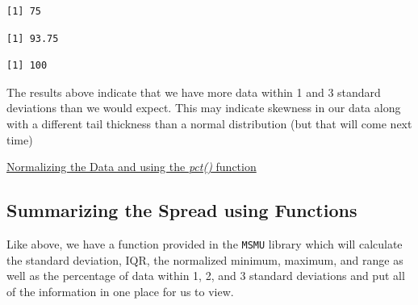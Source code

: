 \documentclass[
  letterpaper,
  DIV=11,
  numbers=noendperiod]{scrreprt}
\newenvironment{Shaded}{\begin{snugshade}}{\end{snugshade}}
\newcommand{\CommentTok}[1]{\textcolor[rgb]{0.37,0.37,0.37}{#1}}
\newcommand{\DecValTok}[1]{\textcolor[rgb]{0.68,0.00,0.00}{#1}}
\newcommand{\FunctionTok}[1]{\textcolor[rgb]{0.28,0.35,0.67}{#1}}
\newcommand{\NormalTok}[1]{\textcolor[rgb]{0.00,0.23,0.31}{#1}}
\newcommand{\SpecialCharTok}[1]{\textcolor[rgb]{0.37,0.37,0.37}{#1}}
\begin{document}
\begin{verbatim}
[1] 75
\end{verbatim}

\begin{Shaded}
\end{Shaded}

\begin{verbatim}
[1] 93.75
\end{verbatim}

\begin{Shaded}
\end{Shaded}

\begin{verbatim}
[1] 100
\end{verbatim}

The results above indicate that we have more data within 1 and 3
standard deviations than we would expect. This may indicate skewness in
our data along with a different tail thickness than a normal
distribution (but that will come next time)

\begin{watch}{}{}
    \href{https://youtu.be/9ckiM6PbICI}{Normalizing the Data and using the \textit{pct()} function}
\end{watch}

\subsection{Summarizing the Spread using
Functions}\label{summarizing-the-spread-using-functions}

Like above, we have a function provided in the \texttt{MSMU} library
which will calculate the standard deviation, IQR, the normalized
minimum, maximum, and range as well as the percentage of data within 1,
2, and 3 standard deviations and put all of the information in one place
for us to view.

\begin{Shaded}
\end{Shaded}
\end{document}
